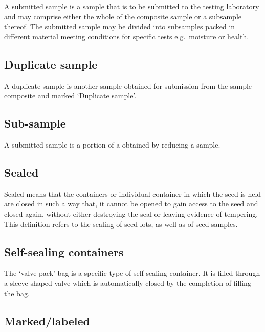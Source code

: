 \documentclass[
]{book}
\begin{document}
A submitted sample is a sample that is to be submitted to the testing laboratory and may comprise either the whole of the composite sample or a subsample thereof. The submitted sample may be divided into subsamples packed in different material meeting conditions for specific tests e.g.~moisture or health.

\hypertarget{duplicate-sample}{%
\subsection{Duplicate sample}\label{duplicate-sample}}

A duplicate sample is another sample obtained for submission from the sample composite and marked `Duplicate sample'.

\hypertarget{sub-sample}{%
\subsection{Sub-sample}\label{sub-sample}}

A submitted sample is a portion of a obtained by reducing a sample.

\hypertarget{sealed}{%
\subsection{Sealed}\label{sealed}}

Sealed means that the containers or individual container in which the seed is held are closed in such a way that, it cannot be opened to gain access to the seed and closed again, without either destroying the seal or leaving evidence of tempering. This definition refers to the sealing of seed lots, as well as of seed samples.

\hypertarget{self-sealing-containers}{%
\subsection{Self-sealing containers}\label{self-sealing-containers}}

The `valve-pack' bag is a specific type of self-sealing container. It is filled through a sleeve-shaped valve which is automatically closed by the completion of filling the bag.

\hypertarget{markedlabeled}{%
\subsection{Marked/labeled}\label{markedlabeled}}
\end{document}
